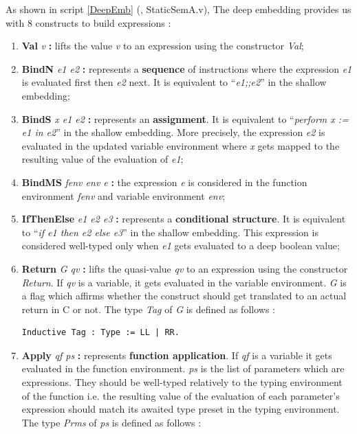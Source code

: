 As shown in script \ref{DeepEmb} (\cite{DEC}, StaticSemA.v), The deep embedding provides us with 8 constructs to build expressions :
\begin{enumerate}
	\item \textbf{Val} \textit{v} \textbf{:} lifts the value \textit{v} to an expression using the constructor \textit{Val};
	\item \textbf{BindN} \textit{e1 e2} \textbf{:} represents a \textbf{sequence} of instructions where the expression \textit{e1} is evaluated first then \textit{e2} next. It is equivalent to ``\textit{e1;;e2}'' in the shallow embedding;
	\item \textbf{BindS} \textit{x e1 e2} \textbf{:} represents an \textbf{assignment}. It is equivalent to ``\textit{perform x := e1 in e2}'' in the shallow embedding. More precisely, the expression \textit{e2} is evaluated in the updated variable environment where \textit{x} gets mapped to the resulting value of the evaluation of \textit{e1};
	\item \textbf{BindMS} \textit{fenv env e} \textbf{:} the expression \textit{e} is considered in the function environment \textit{fenv} and variable environment \textit{env};
	\item \textbf{IfThenElse} \textit{e1 e2 e3} \textbf{:} represents a \textbf{conditional structure}. It is equivalent to ``\textit{if e1 then e2 else e3}'' in the shallow embedding. This expression is considered well-typed only when \textit{e1} gets evaluated to a deep boolean value;
	\item \textbf{Return} \textit{G qv} \textbf{:} lifts the quasi-value \textit{qv} to an expression using the constructor \textit{Return}. If \textit{qv} is a variable, it gets evaluated in the variable environment. \textit{G} is a flag which affirms whether the construct should get translated to an actual return in C or not. The type \textit{Tag} of \textit{G} is defined as follows :
\begin{lstlisting}[caption = {Tag type in the deep embedding},xleftmargin=.12\textwidth,
xrightmargin=.18\textwidth]
Inductive Tag : Type := LL | RR.      
\end{lstlisting}
	\item \textbf{Apply} \textit{qf ps} \textbf{:} represents \textbf{function application}. If \textit{qf} is a variable it gets evaluated in the function environment. \textit{ps} is the list of parameters which are expressions. They should be well-typed relatively to the typing environment of the function i.e. the resulting value of the evaluation of each parameter's expression should match its awaited type preset in the typing environment. The type \textit{Prms} of \textit{ps} is defined as follows :

\end{enumerate}
